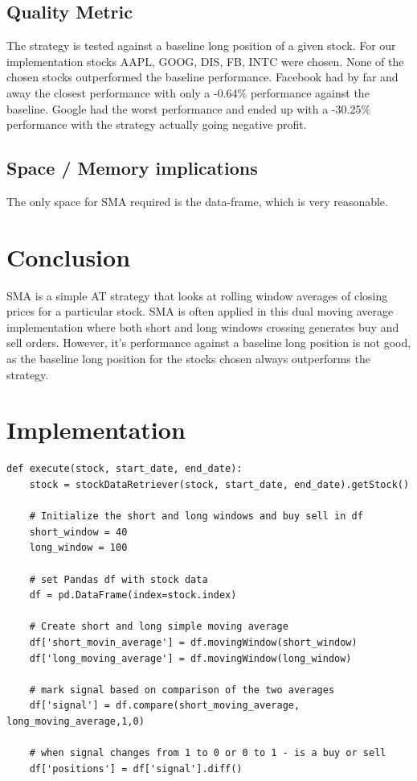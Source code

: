 \documentclass[letterpaper,11pt]{article}
\begin{document}
\subsection*{Quality Metric}
The strategy is tested against a baseline long position of a given stock. For our implementation stocks AAPL, GOOG, DIS, FB, INTC were chosen. None of the chosen stocks outperformed the baseline performance. Facebook had by far and away the closest performance with only a -0.64\% performance against the baseline. Google had the worst performance and ended up with a -30.25\% performance with the strategy actually going negative profit.

\subsection*{Space / Memory implications}
The only space for SMA required is the data-frame, which is very reasonable.

\section*{Conclusion}

SMA is a simple AT strategy that looks at rolling window averages of closing prices for a particular stock. SMA is often applied in this dual moving average implementation where both short and long windows crossing generates buy and sell orders. However, it's performance against a baseline long position is not good, as the baseline long position for the stocks chosen always outperforms the strategy. 

\section*{Implementation}
\begin{verbatim}
def execute(stock, start_date, end_date):
    stock = stockDataRetriever(stock, start_date, end_date).getStock()

    # Initialize the short and long windows and buy sell in df
    short_window = 40
    long_window = 100
    
    # set Pandas df with stock data
    df = pd.DataFrame(index=stock.index)

    # Create short and long simple moving average 
    df['short_movin_average'] = df.movingWindow(short_window)
    df['long_moving_average'] = df.movingWindow(long_window)
    
    # mark signal based on comparison of the two averages
    df['signal'] = df.compare(short_moving_average, long_moving_average,1,0)
    
    # when signal changes from 1 to 0 or 0 to 1 - is a buy or sell
    df['positions'] = df['signal'].diff()

\end{verbatim}



\end{document}
